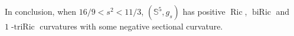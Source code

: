 \documentclass[11pt,letterpaper]{amsart}
\DeclareMathOperator{\Ric}{Ric}
\DeclareMathOperator{\biRic}{biRic}
\newcommand{\ove}{\overline{e}}
\newcommand{\bS}{\mathbb{S}}
\theoremstyle{definition}
\theoremstyle{remark}
\numberwithin{equation}{section}
\begin{document}
    
In conclusion, when $16/9< s^2<11/3$, $(\bS^5, g_{s})$ has positive $\Ric$, $\biRic$ and $1\operatorname{-triRic}$ curvatures with some negative sectional curvature.
\end{document}
